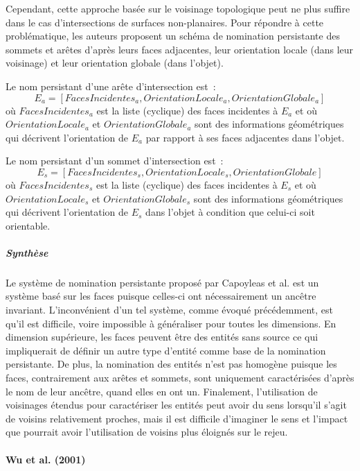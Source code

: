 Cependant, cette approche basée sur le voisinage topologique peut ne plus
suffire dans le cas d'intersections de surfaces non-planaires. %
Pour répondre à cette problématique, les auteurs proposent un schéma de
nomination persistante des sommets et arêtes d'après leurs faces adjacentes,
leur orientation locale (dans leur voisinage) et leur orientation globale (dans
l'objet). %

Le nom persistant d'une arête d'intersection est~:
\[E_{a} = [FacesIncidentes_{a}, OrientationLocale_{a}, OrientationGlobale_{a}]\]
où \(FacesIncidentes_{a}\) est la liste (cyclique) des faces incidentes à
\(E_{a}\) et où \(OrientationLocale_{a}\) et \(OrientationGlobale_{a}\) sont des
informations géométriques qui décrivent l'orientation de \(E_{a}\) par rapport à
ses faces adjacentes dans l'objet.

Le nom persistant d'un sommet d'intersection est~: %
\[E_{s} = [FacesIncidentes_{s},OrientationLocale_{s},OrientationGlobale]\] %
où \(\mathit{FacesIncidentes_{s}}\) est la liste (cyclique) des faces incidentes
à \(E_{s}\) et où \(\mathit{OrientationLocale_{s}}\) et
\(\mathit{OrientationGlobale_{s}}\) sont des informations géométriques qui
décrivent l'orientation de \(E_{s}\) dans l'objet à condition que celui-ci soit
orientable. %

\subparagraph{Synthèse}

Le système de nomination persistante proposé par Capoyleas et al. est un système
basé sur les faces puisque celles-ci ont nécessairement un ancêtre invariant. %
L'inconvénient d'un tel système, comme évoqué précédemment, est qu'il est
difficile, voire impossible à généraliser pour toutes les dimensions. %
En dimension supérieure, les faces peuvent être des entités sans source ce qui
impliquerait de définir un autre type d'entité comme base de la nomination
persistante. %
De plus, la nomination des entités n'est pas homogène puisque les faces,
contrairement aux arêtes et sommets, sont uniquement caractérisées d'après le
nom de leur ancêtre, quand elles en ont un. %
Finalement, l'utilisation de voisinages étendus pour caractériser les entités
peut avoir du sens lorsqu'il s'agit de voisins relativement proches, mais il est
difficile d'imaginer le sens et l'impact que pourrait avoir l'utilisation de
voisins plus éloignés sur le rejeu. %



\paragraph*{Wu et al. (2001)}



